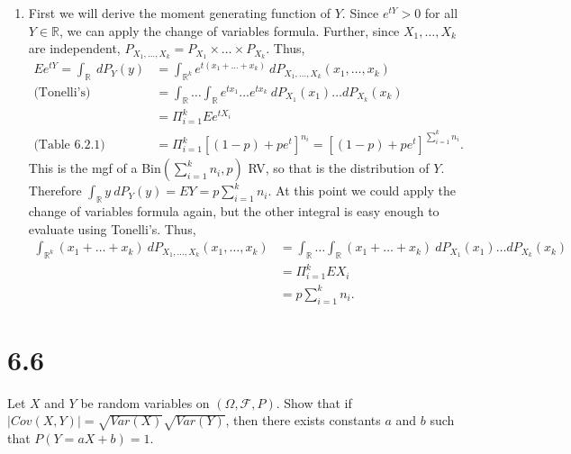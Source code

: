 \documentclass[12pt]{article}
\begin{document}
\begin{enumerate}[label=(\alph*)]
\item 
First we will derive the moment generating function of $Y$. Since $e^{tY} > 0$ for all $Y \in \mathbb{R}$, we can apply the change of variables
formula. Further, since $X_{1}, \hdots, X_{k}$ are independent, $P_{X_{1}, \hdots, X_{k}} = P_{X_{1}}\times \dots \times P_{X_{k}}$. Thus,
\begin{align*}
Ee^{tY} = \int_{\mathbb{R}}\ dP_{Y}(y) & = \int_{\mathbb{R}^{k}}e^{t(x_{1} + \dots + x_{k})}\ dP_{X_{1}, \hdots, X_{k}}(x_{1}, \hdots, x_{k}) \\
\text{(Tonelli's) } & = \int_{\mathbb{R}}\dots \int_{\mathbb{R}}e^{tx_{1}}\dots e^{tx_{k}}\ dP_{X_{1}}(x_{1})\dots dP_{X_{k}}(x_{k}) \\
& = \Pi_{i=1}^{k} Ee^{tX_{i}} \\
\text{(Table 6.2.1) } & = \Pi_{i=1}^{k} [(1-p) + pe^{t}]^{n_{i}} = [(1-p) + pe^{t}]^{\sum_{i=1}^{k}n_{i}}.
\end{align*}
This is the mgf of a Bin$(\sum_{i=1}^{k}n_{i}, p)$ RV, so that is the distribution of $Y$. Therefore $\int_{\mathbb{R}}y\ dP_{Y}(y) = EY =
p\sum_{i=1}^{k}n_{i}$. At this point we could apply the change of variables formula again, but the other integral is easy enough to evaluate 
using Tonelli's. Thus,
\begin{align*}
\int_{\mathbb{R}^{k}}(x_{1} + \dots + x_{k})\ dP_{X_{1},\hdots, X_{k}}(x_{1}, \hdots, x_{k}) & = \int_{\mathbb{R}}\dots \int_{\mathbb{R}} 
(x_{1} + \dots + x_{k})\ dP_{X_{1}}(x_{1})\dots dP_{X_{k}}(x_{k}) \\
& = \Pi_{i=1}^{k}EX_{i} \\
& = p\sum_{i=1}^{k}n_{i}.
\end{align*}

\end{enumerate}






\newpage 
\section*{6.6}
Let $X$ and $Y$ be random variables on $(\Omega, \mathcal{F}, P)$. Show that if $|Cov(X,Y)| = \sqrt{Var(X)}\sqrt{Var(Y)}$, then there exists constants
$a$ and $b$ such that $P(Y = aX + b) = 1$.
\end{document}
